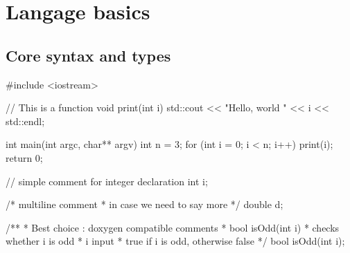 \section[base]{Langage basics}

\subsection[Core]{Core syntax and types}

\begin{frame}[fragile]
  \begin{cppcode}
    #include <iostream>

    // This is a function
    void print(int i) {
      std::cout << "Hello, world " << i << std::endl;
    }

    int main(int argc, char** argv) {
      int n = 3;
      for (int i = 0; i < n; i++) {
        print(i);
      }
      return 0;
    }
  \end{cppcode}
\end{frame}

\begin{frame}[fragile]
  \begin{cppcode}
    // simple comment for integer declaration
    int i;

    /* multiline comment
     * in case we need to say more
     */
    double d;

    /**
     * Best choice : doxygen compatible comments
     * \fn bool isOdd(int i)
     * \brief checks whether i is odd
     * \param i input
     * \return true if i is odd, otherwise false
     */
    bool isOdd(int i);
  \end{cppcode}
\end{frame}

